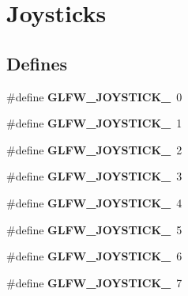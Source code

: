\hypertarget{group__joysticks}{\section{\-Joysticks}
\label{group__joysticks}
}
\subsection*{\-Defines}
\begin{DoxyCompactItemize}
\item 
\hypertarget{group__joysticks_ga34a0443d059e9f22272cd4669073f73d}{\#define {\bfseries \-G\-L\-F\-W\-\_\-\-J\-O\-Y\-S\-T\-I\-C\-K\-\_}~0}\label{group__joysticks_ga34a0443d059e9f22272cd4669073f73d}

\item 
\hypertarget{group__joysticks_ga6eab65ec88e65e0850ef8413504cb50c}{\#define {\bfseries \-G\-L\-F\-W\-\_\-\-J\-O\-Y\-S\-T\-I\-C\-K\-\_}~1}\label{group__joysticks_ga6eab65ec88e65e0850ef8413504cb50c}

\item 
\hypertarget{group__joysticks_gae6f3eedfeb42424c2f5e3161efb0b654}{\#define {\bfseries \-G\-L\-F\-W\-\_\-\-J\-O\-Y\-S\-T\-I\-C\-K\-\_}~2}\label{group__joysticks_gae6f3eedfeb42424c2f5e3161efb0b654}

\item 
\hypertarget{group__joysticks_ga97ddbcad02b7f48d74fad4ddb08fff59}{\#define {\bfseries \-G\-L\-F\-W\-\_\-\-J\-O\-Y\-S\-T\-I\-C\-K\-\_}~3}\label{group__joysticks_ga97ddbcad02b7f48d74fad4ddb08fff59}

\item 
\hypertarget{group__joysticks_gae43281bc66d3fa5089fb50c3e7a28695}{\#define {\bfseries \-G\-L\-F\-W\-\_\-\-J\-O\-Y\-S\-T\-I\-C\-K\-\_}~4}\label{group__joysticks_gae43281bc66d3fa5089fb50c3e7a28695}

\item 
\hypertarget{group__joysticks_ga74771620aa53bd68a487186dea66fd77}{\#define {\bfseries \-G\-L\-F\-W\-\_\-\-J\-O\-Y\-S\-T\-I\-C\-K\-\_}~5}\label{group__joysticks_ga74771620aa53bd68a487186dea66fd77}

\item 
\hypertarget{group__joysticks_ga20a9f4f3aaefed9ea5e66072fc588b87}{\#define {\bfseries \-G\-L\-F\-W\-\_\-\-J\-O\-Y\-S\-T\-I\-C\-K\-\_}~6}\label{group__joysticks_ga20a9f4f3aaefed9ea5e66072fc588b87}

\item 
\hypertarget{group__joysticks_ga21a934c940bcf25db0e4c8fe9b364bdb}{\#define {\bfseries \-G\-L\-F\-W\-\_\-\-J\-O\-Y\-S\-T\-I\-C\-K\-\_}~7}\label{group__joysticks_ga21a934c940bcf25db0e4c8fe9b364bdb}


\end{DoxyCompactItemize}
